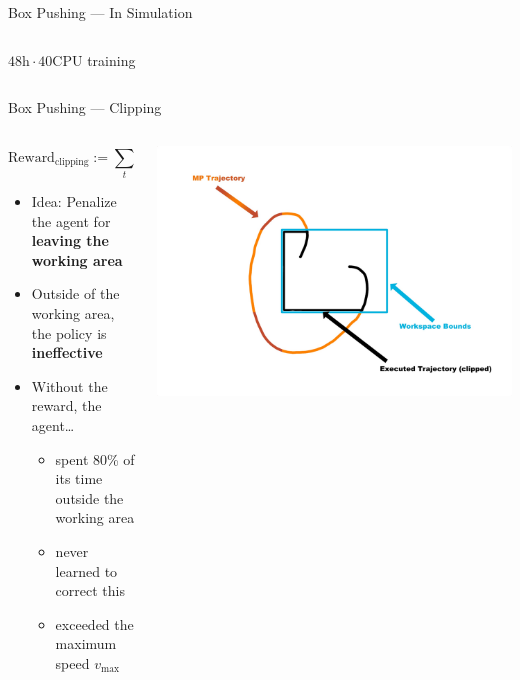 \documentclass[16:9,en,navbarinfooter]{sdqbeamer}
\begin{document}
\begin{frame}{Box Pushing --- In Simulation}
\begin{columns}[t]
\begin{column}{0.5\textwidth}
        \center 
        $48\text{h} \cdot 40\text{CPU}$ training

    \end{column}
\end{columns}
\end{frame}

\begin{frame}{Box Pushing --- Clipping }
    \begin{columns}
    \begin{column}{0.4\textwidth}
        \vspace{.1cm}
        \[ \text{Reward}_{\text{clipping}} := \sum_t \left\Vert x_t - x_t^\text{clipped} \right\Vert \]
        \begin{itemize}
            \item Idea: Penalize the agent for \textbf{leaving the working area}
            \item Outside of the working area, the policy is \textbf{ineffective}
            \item Without the reward, the agent\dots 
            \begin{itemize}
                    \item spent 80\% of its time outside the working area
                    \item never learned to correct this
                    \item exceeded the maximum speed $v_\text{max}$
            \end{itemize}
        \end{itemize}
    \end{column}
    \begin{column}{0.6\textwidth}
        \vspace{.1cm}
    \center
    \includegraphics[width=\linewidth]{media/workspace_clipping.pdf}

    \end{column}
    \end{columns}
\end{frame}
\end{document}
